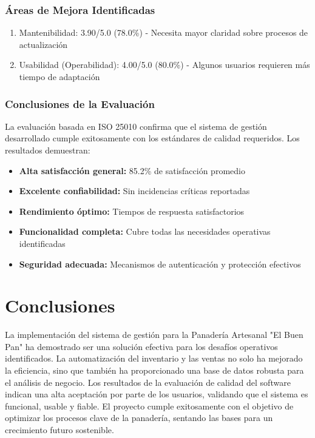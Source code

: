 \documentclass[conference]{IEEEtran}
\begin{document}
\subsubsection{Áreas de Mejora Identificadas}
\begin{enumerate}
    \item Mantenibilidad: 3.90/5.0 (78.0\%) - Necesita mayor claridad sobre procesos de actualización
    \item Usabilidad (Operabilidad): 4.00/5.0 (80.0\%) - Algunos usuarios requieren más tiempo de adaptación
\end{enumerate}

\subsubsection{Conclusiones de la Evaluación}
La evaluación basada en ISO 25010 confirma que el sistema de gestión desarrollado cumple exitosamente con los estándares de calidad requeridos. Los resultados demuestran:

\begin{itemize}
    \item \textbf{Alta satisfacción general:} 85.2\% de satisfacción promedio
    \item \textbf{Excelente confiabilidad:} Sin incidencias críticas reportadas
    \item \textbf{Rendimiento óptimo:} Tiempos de respuesta satisfactorios
    \item \textbf{Funcionalidad completa:} Cubre todas las necesidades operativas identificadas
    \item \textbf{Seguridad adecuada:} Mecanismos de autenticación y protección efectivos
\end{itemize}

\section{Conclusiones}
La implementación del sistema de gestión para la Panadería Artesanal "El Buen Pan" ha demostrado ser una solución efectiva para los desafíos operativos identificados. La automatización del inventario y las ventas no solo ha mejorado la eficiencia, sino que también ha proporcionado una base de datos robusta para el análisis de negocio. Los resultados de la evaluación de calidad del software indican una alta aceptación por parte de los usuarios, validando que el sistema es funcional, usable y fiable. El proyecto cumple exitosamente con el objetivo de optimizar los procesos clave de la panadería, sentando las bases para un crecimiento futuro sostenible.
\end{document}
